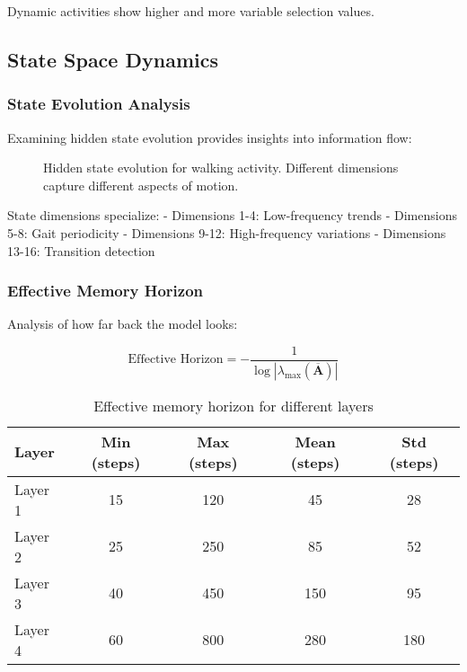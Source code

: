 \documentclass[10pt,journal,compsoc]{IEEEtran}
\begin{document}
Dynamic activities show higher and more variable selection values.

\subsection{State Space Dynamics}

\subsubsection{State Evolution Analysis}

Examining hidden state evolution provides insights into information flow:

\begin{figure}[h]
\centering
\framebox[0.45\textwidth]{\rule{0pt}{3cm}}
\caption{Hidden state evolution for walking activity. Different dimensions capture different aspects of motion.}
\label{fig:state_evolution}
\end{figure}

State dimensions specialize:
- Dimensions 1-4: Low-frequency trends
- Dimensions 5-8: Gait periodicity
- Dimensions 9-12: High-frequency variations
- Dimensions 13-16: Transition detection

\subsubsection{Effective Memory Horizon}

Analysis of how far back the model looks:

\begin{equation}
\text{Effective Horizon} = -\frac{1}{\log|\lambda_{\max}(\overline{\mathbf{A}})|}
\end{equation}

\begin{table}[h]
\centering
\caption{Effective memory horizon for different layers}
\label{tab:memory_horizon}
\begin{tabular}{lcccc}
\toprule
Layer & Min (steps) & Max (steps) & Mean (steps) & Std (steps) \\
\midrule
Layer 1 & 15 & 120 & 45 & 28 \\
Layer 2 & 25 & 250 & 85 & 52 \\
Layer 3 & 40 & 450 & 150 & 95 \\
Layer 4 & 60 & 800 & 280 & 180 \\
\bottomrule
\end{tabular}
\end{table}
\end{document}
